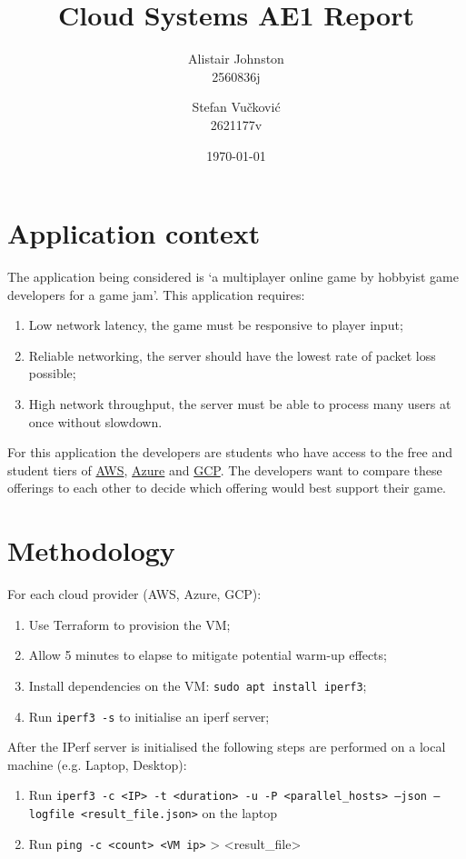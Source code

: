 \documentclass[11pt,a4paper]{article}
\title{Cloud Systems AE1 Report}
\author{
  Alistair Johnston \\  2560836j
  \and
  Stefan Vučković \\ 2621177v
}
\date{\today} %
\begin{document}
\flushbottom
\maketitle
\thispagestyle{empty}

\section*{Application context}
The application being considered is `a multiplayer online game by hobbyist game developers for a game jam'.
This application requires:
\begin{enumerate}
\item{Low network latency, the game must be responsive to player input};
\item{Reliable networking, the server should have the lowest rate of packet loss possible};
\item{High network throughput, the server must be able to process many users at once without slowdown}.
\end{enumerate}

For this application the developers are students who have access to the free and student tiers of \href{https://aws.amazon.com/free/}{AWS}, \href{https://azure.microsoft.com/en-us/free/students}{Azure} and \href{https://cloud.google.com/free?hl=en}{GCP}. The developers want to compare these offerings to each other to decide which offering would best support their game.

\section*{Methodology}
For each cloud provider (AWS, Azure, GCP):
\begin{enumerate}
  \item{Use Terraform to provision the VM;} %
  \item{Allow 5 minutes to elapse to mitigate potential warm-up effects;}
  \item{Install dependencies on the VM: \texttt{sudo apt install iperf3};}
  \item{Run \texttt{iperf3 -s} to initialise an iperf server;}
\end{enumerate}

After the IPerf server is initialised the following steps are performed on a local machine (e.g. Laptop, Desktop):
\begin{enumerate}
  \item{Run \texttt{iperf3 -c <IP> -t <duration>  -u -P <parallel\_hosts> --json --logfile <result\_file.json>} on the laptop}
  \item{Run \texttt{ping -c <count> <VM ip>} > <result\_file>}
\end{enumerate}
\end{document}
